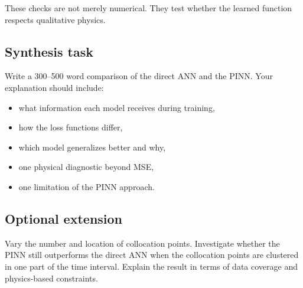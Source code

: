\documentclass[11pt]{article}
\begin{document}
These checks are not merely numerical. They test whether the learned function respects qualitative physics.

\subsection*{Synthesis task}
Write a 300--500 word comparison of the direct ANN and the PINN. Your explanation should include:
\begin{itemize}
    \item what information each model receives during training,
    \item how the loss functions differ,
    \item which model generalizes better and why,
    \item one physical diagnostic beyond MSE,
    \item one limitation of the PINN approach.
\end{itemize}

\subsection*{Optional extension}
Vary the number and location of collocation points. Investigate whether the PINN still outperforms the direct ANN when the collocation points are clustered in one part of the time interval. Explain the result in terms of data coverage and physics-based constraints.
\end{document}
